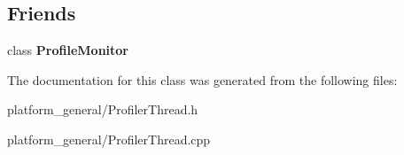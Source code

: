 \subsection*{\-Friends}
\begin{DoxyCompactItemize}
\item 
\hypertarget{classgeneral__server_1_1ProfilerThread_a11876ab8791587275bc71d4768365a00}{class {\bfseries \-Profile\-Monitor}}\label{classgeneral__server_1_1ProfilerThread_a11876ab8791587275bc71d4768365a00}

\end{DoxyCompactItemize}


\-The documentation for this class was generated from the following files\-:\begin{DoxyCompactItemize}
\item 
platform\-\_\-general/\-Profiler\-Thread.\-h\item 
platform\-\_\-general/\-Profiler\-Thread.\-cpp\end{DoxyCompactItemize}
